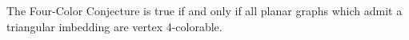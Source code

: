 The Four-Color Conjecture is true if and only if all planar graphs which admit a triangular imbedding are vertex 4-colorable.
